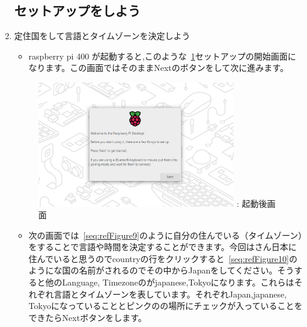 \documentclass[a4paper,12pt]{jarticle}
\begin{document}
\begin{enumerate}
  \subsection{セットアップをしよう}
  \item 定住国をして言語とタイムゾーンを決定しよう
        \begin{itemize}
          \item
                raspberry pi 400 が起動すると,このような~\ref{seq:refFigure8}セットアップの開始画面になります。この画面ではそのままNextのボタンをして次に進みます。
        \end{itemize} 
        \begin{figure}[h]
          \centering
          \begin{minipage}{5.222cm}
          {\upshape
            \includegraphics[width=8.613cm]{sw_image01.png}
            \newline
            {\theFigure\label{seq:refFigure8}}:
            起動後画面
          }
        \end{minipage}
        \end{figure}

        \begin{itemize}
          \item
              次の画面では~\ref{seq:refFigure9}のように自分の住んでいる（タイムゾーン）をすることで言語や時間を決定することができます。今回はさん日本に住んでいると思うのでcountryの行をクリックすると~\ref{seq:refFigure10}のようにな国の名前がされるのでその中からJapanをしてください。そうすると他のLanguage, Timezoneのがjapanese,Tokyoになります。これらはそれぞれ言語とタイムゾーンを表しています。それぞれJapan,japanese, Tokyoになっていることとピンクのの場所にチェックが入っていることをできたらNextボタンをします。
              

\end{itemize}
\end{enumerate}
\end{document}
